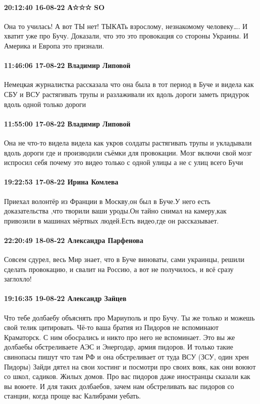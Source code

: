 \paragraph{20:12:40 16-08-22 А☆☆☆ SO}

Она то училась! А вот ТЫ нет! ТЫКАТь взрослому, незнакомому человеку…. И хватит
уже про Бучу. Доказали, что это это провокация со стороны Украины. И Америка и
Европа это признали.

\paragraph{11:46:06 17-08-22 Владимир Липовой}

Немецкая журналистка рассказала что она была в тот период в Буче и видела как
СБУ и ВСУ растягивать трупы и разлаживали их вдоль дороги заметь придурок вдоль
одной только дороги

\paragraph{11:55:00 17-08-22 Владимир Липовой}

Она не что-то видела видела как укров солдаты растягивать трупы и укладывали
вдоль дороги где и производили съёмки для провокации. Мозг включи свой мозг
испросил себя почему это видео только с одной улицы а не с улиц всего Бучи

\paragraph{19:22:53 17-08-22 Ирина Комлева}

Приехал волонтёр из Франции в Москву,он был в Буче.У него есть доказательства
,что творили ваши уроды.Он тайно снимал на камеру,как привозили в машинах
мёртвых людей.Есть видео,где он рассказывает.

\paragraph{22:20:49 18-08-22 Александра Парфенова}

Совсем сдурел, весь Мир знает, что в Буче виноваты, сами украинцы, решили
сделать провокацию, и свалит на Россию, а вот не получилось, и всё сразу
заглохло!

\paragraph{19:16:35 19-08-22 Александр Зайцев}

Что тебе долбаебу объяснять про Мариуполь и про Бучу. Ты же только и можешь
свой телик цитировать. Чё-то ваша братия из Пидоров не вспоминают Краматорск. С
ним обосрались и никто про него не вспоминает. Это вы же долбаебы обстреливаете
АЭС и Энергодар, армия пидоров. И только такие свинопасы пишут что там РФ и она
обстреливает от туда ВСУ (ЗСУ, один хрен Пидоры) Зайди дятел на свои хостинг и
посмотри про своих вояк, как они воюют со школ, садиков. Жилых домов. Про вас
пидоров даже иностранцы сказали как вы воюете. И для таких долбаебов, зачем нам
обстреливать вас пидоров со станции, когда проще вас Калибрами уебать.
